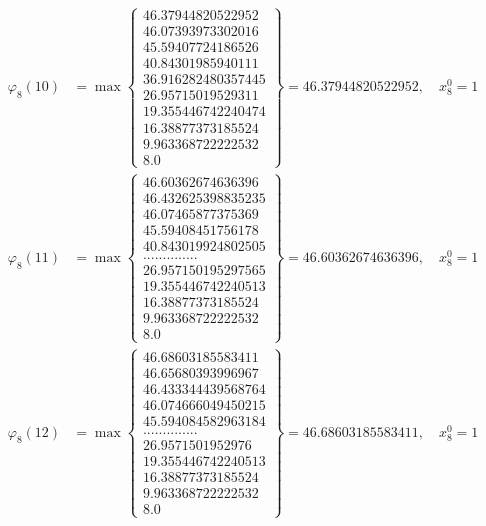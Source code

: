 \documentclass{article}
\begin{document}
\begin{align*}
  
  
  
\varphi_{8}(10) &= \max \left\{ \begin{array}{c}
46.37944820522952 \\
 46.07393973302016 \\
 45.59407724186526 \\
 40.84301985940111 \\
 36.916282480357445 \\
 26.95715019529311 \\
 19.355446742240474 \\
 16.38877373185524 \\
 9.963368722222532 \\
 8.0
\end{array} \right\} = 46.37944820522952, \quad x_{8}^0 = 1\\
  
  
  
  
\varphi_{8}(11) &= \max \left\{ \begin{array}{c}
46.60362674636396 \\
 46.432625398835235 \\
 46.07465877375369 \\
 45.59408451756178 \\
 40.843019924802505 \\
 .............. \\
 26.957150195297565 \\
 19.355446742240513 \\
 16.38877373185524 \\
 9.963368722222532 \\
 8.0
\end{array} \right\} = 46.60362674636396, \quad x_{8}^0 = 1\\
  
  
  
  
\varphi_{8}(12) &= \max \left\{ \begin{array}{c}
46.68603185583411 \\
 46.65680393996967 \\
 46.433344439568764 \\
 46.074666049450215 \\
 45.594084582963184 \\
 .............. \\
 26.9571501952976 \\
 19.355446742240513 \\
 16.38877373185524 \\
 9.963368722222532 \\
 8.0
\end{array} \right\} = 46.68603185583411, \quad x_{8}^0 = 1\\
  

\end{align*}
\end{document}
